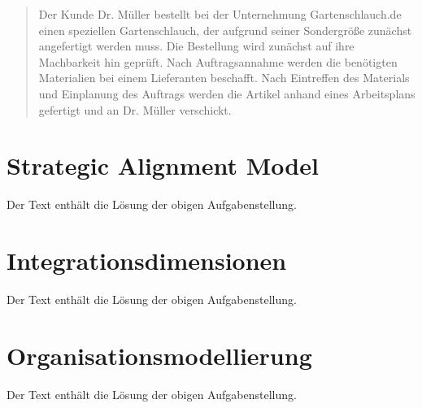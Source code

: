 \begin{universityTask}
\begin{enumerate}[label=(\alph*)]
            \begin{quotation}
                \begin{itshape}
                    Der Kunde Dr. Müller bestellt bei der Unternehmung Gartenschlauch.de einen speziellen Gartenschlauch, der aufgrund seiner Sondergröße zunächst angefertigt werden muss. Die Bestellung wird zunächst auf ihre Machbarkeit hin geprüft. Nach Auftragsannahme werden die benötigten Materialien bei einem Lieferanten beschafft. Nach Eintreffen des Materials und Einplanung des Auftrags werden die Artikel anhand eines Arbeitsplans gefertigt und an Dr. Müller verschickt.
                \end{itshape}
            \end{quotation}
    \end{enumerate}
\end{universityTask}

\section{Strategic Alignment Model}
\label{sec:02-01_strategic-alignment-model}

Der Text enthält die Lösung der obigen Aufgabenstellung.

\section{Integrationsdimensionen}
\label{sec:02-02_integration-dimensions}

Der Text enthält die Lösung der obigen Aufgabenstellung.

\section{Organisationsmodellierung}
\label{sec:02-03_organizational-modeling}

Der Text enthält die Lösung der obigen Aufgabenstellung.